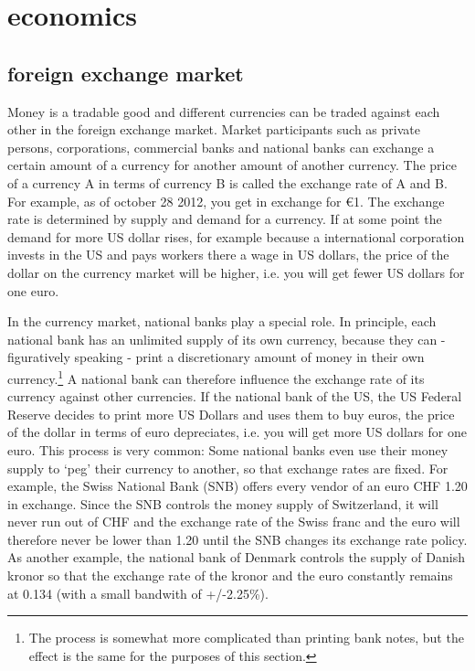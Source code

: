 \documentclass[11pt]{article}
\begin{document}
\section{economics}

\subsection{foreign exchange market}

Money is a tradable good and different currencies can be traded against each other in the foreign exchange market. Market participants such as private persons, corporations, commercial banks and national banks can exchange a certain amount of a currency for another amount of another currency. The price of a currency A in terms of currency B is called the exchange rate of A and B. For example, as of october 28 2012, you get  in exchange for \euro{1}. The exchange rate is determined by supply and demand for a currency. If at some point the demand for more US dollar rises, for example because a international corporation invests in the US and pays workers there a wage in US dollars, the price of the dollar on the currency market will be higher, i.e. you will get fewer US dollars for one euro.

In the currency market, national banks play a special role. In principle, each national bank has an unlimited supply of its own currency, because they can - figuratively speaking - print a discretionary amount of money in their own currency.\footnote{The process is somewhat more complicated than printing bank notes, but the effect is the same for the purposes of this section.} A national bank can therefore influence the exchange rate of its currency against other currencies. If the national bank of the US, the US Federal Reserve decides to print more US Dollars and uses them to buy euros, the price of the dollar in terms of euro depreciates, i.e. you will get more US dollars for one euro. This process is very common: Some national banks even use their money supply to `peg' their currency to another, so that exchange rates are fixed. For example, the Swiss National Bank (SNB) offers every vendor of an euro CHF 1.20 in exchange. Since the SNB controls the money supply of Switzerland, it will never run out of CHF and the exchange rate of the Swiss franc and the euro will therefore never be lower than 1.20 until the SNB changes its exchange rate policy. As another example, the national bank of Denmark controls the supply of Danish kronor so that the exchange rate of the kronor and the euro constantly remains at 0.134 (with a small bandwith of +/-2.25\%). 
\end{document}
